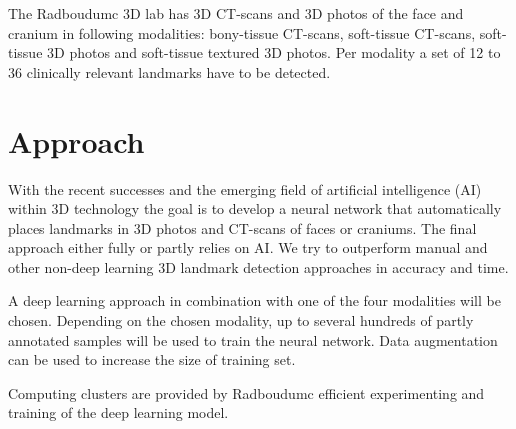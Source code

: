 \documentclass{article}
\begin{document}
The Radboudumc 3D lab has 3D CT-scans and 3D photos of the face and cranium in following modalities: bony-tissue CT-scans, soft-tissue CT-scans, soft-tissue 3D photos and soft-tissue textured 3D photos. Per modality a set of 12 to 36 clinically relevant landmarks have to be detected.



\section{Approach}
With the recent successes and the emerging field of artificial intelligence (AI) within 3D technology the goal is to develop a neural network that automatically places landmarks in 3D photos and CT-scans of faces or craniums. The final approach either fully or partly relies on AI. We try to outperform manual and other non-deep learning 3D landmark detection approaches in accuracy and time.

A deep learning approach in combination with one of the four modalities will be chosen. 
Depending on the chosen modality, up to several hundreds of partly annotated samples will be used to train the neural network. Data augmentation can be used to increase the size of training set.

Computing clusters are provided by Radboudumc efficient experimenting and training of the deep learning model.
\end{document}
